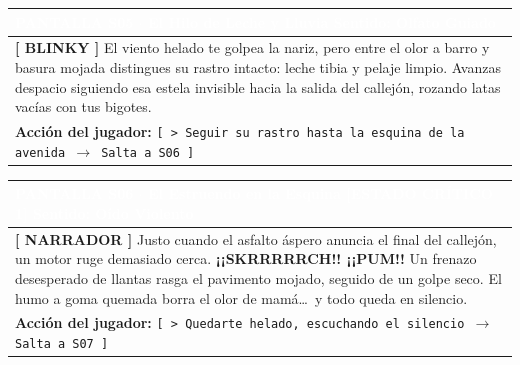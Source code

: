 \documentclass[11pt, a4paper]{article}
\begin{document}
\noindent
\begin{tabularx}{\textwidth}{|X|}
\hline
\rowcolor{colorHeader}
\textbf{\textcolor{white}{PANTALLA S05 $\cdot$ El Hilo de Leche y Lluvia}} \hfill \small\textcolor{white}{Sentido: Olfato Guiado} \\ \hline
\rowcolor{colorTextoBox}
\textbf{\textcolor{colorEmisor}{[ BLINKY ]}} \vspace{0.2em}\newline
El viento helado te golpea la nariz, pero entre el olor a barro y basura mojada distingues su rastro intacto: leche tibia y pelaje limpio. Avanzas despacio siguiendo esa estela invisible hacia la salida del callejón, rozando latas vacías con tus bigotes. \\ \hline
\rowcolor{colorBotonBox}
\textbf{Acción del jugador:} \newline
\texttt{[ > Seguir su rastro hasta la esquina de la avenida $\rightarrow$ Salta a S06 ]} \\ \hline
\end{tabularx}

\vspace{1em}

\noindent
\begin{tabularx}{\textwidth}{|X|}
\hline
\rowcolor{colorAlerta}
\textbf{\textcolor{white}{PANTALLA S06 $\cdot$ El Estruendo en la Esquina [ESTADO CRÍTICO 1]}} \hfill \small\textcolor{white}{Sentido: Oído Violento} \\ \hline
\rowcolor{colorTextoBox}
\textbf{\textcolor{colorAlerta}{[ NARRADOR ]}} \vspace{0.2em}\newline
Justo cuando el asfalto áspero anuncia el final del callejón, un motor ruge demasiado cerca. \textbf{¡¡SKRRRRRCH!! ¡¡PUM!!} Un frenazo desesperado de llantas rasga el pavimento mojado, seguido de un golpe seco. El humo a goma quemada borra el olor de mamá\ldots\ y todo queda en silencio. \\ \hline
\rowcolor{colorBotonBox}
\textbf{Acción del jugador:} \newline
\texttt{[ > Quedarte helado, escuchando el silencio $\rightarrow$ Salta a S07 ]} \\ \hline
\end{tabularx}

\vspace{1em}
\end{document}
